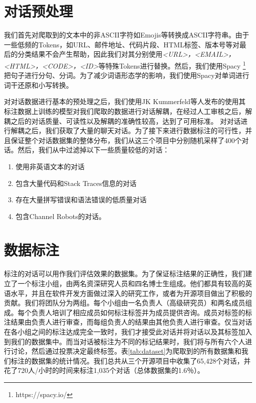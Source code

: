 \section{对话预处理}
我们首先对爬取到的文本中的非ASCII字符如Emojis等转换成ASCII字符串。由于一些低频的Tokens，如URL、邮件地址、代码片段、HTML标签、版本号等对最后的分类结果不会产生帮助，因此我们对其分别使用\textit{<URL>，<EMAIL>，<HTML>，<CODE>，<ID>}等特殊Tokens进行替换。然后，我们使用Spacy \footnote{https://spacy.io/}把句子进行分句、分词。为了减少词语形态学的影响，我们使用Spacy对单词进行词干还原和小写转换。

对对话数据进行基本的预处理之后，我们使用JK Kummerfeld等人\cite{kummerfeld2018large}发布的使用其标注数据上训练的模型对我们爬取的数据进行对话解耦，在经过人工审核之后，解耦之后的对话质量、可读性以及解耦的准确性较高，达到了可用标准。
对对话进行解耦之后，我们获取了大量的聊天对话。为了接下来进行数据标注的可行性，并且保证整个对话数据集的整体分布，我们从这三个项目中分别随机采样了400个对话。然后，我们从中过滤掉以下一些质量较低的对话：
\begin{enumerate}
    \item 使用非英语文本的对话
    \item 包含大量代码和Stack Traces信息的对话
    \item 存在大量拼写错误和语法错误的低质量对话
    \item 包含Channel Robots的对话。
\end{enumerate}

\section{数据标注}
标注的对话可以用作我们评估效果的数据集。为了保证标注结果的正确性，我们建立了一个标注小组，由两名资深研究人员和四名博士生组成。他们都具有较高的英语水平，并且在软件开发方面做过深入的研究工作，或者为开源项目做出了积极的贡献。我们将团队分为两组。每个小组由一名负责人（高级研究员）和两名成员组成。每个负责人培训了相应成员如何标注标签并为成员提供咨询。成员对标签的标注结果由负责人进行审查，而每组负责人的结果由其他负责人进行审查。仅当对话在各小组之间的标注达成完全一致时，我们才接受此对话并将对话以及其标签加入到我们的数据集中。而当对话被标注为不同的标记结果时，我们将与所有六个人进行讨论，然后通过投票决定最终标签。表\ref{tab:dataset}为爬取到的所有数据集和我们标注的数据集的统计情况。我们总共从三个开源项目中收集了65,428个对话，并花了720人/小时的时间来标注1,035个对话（总体数据集的1.6％）。

